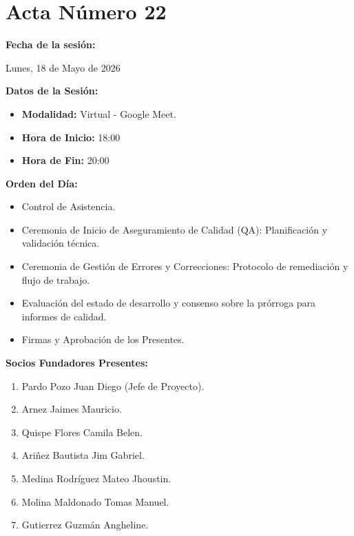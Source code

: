 \newpage
\section{Acta Número 22}
\label{sec:acta22}

\noindent \textbf{Fecha de la sesión:}\par
Lunes, 18 de Mayo de 2026

\vspace*{0.5cm}
\noindent \textbf{Datos de la Sesión:}
\vspace{-0.2cm}
\begin{itemize}[noitemsep]
    \item \textbf{Modalidad:} Virtual - Google Meet.
    \item \textbf{Hora de Inicio:} 18:00
    \item \textbf{Hora de Fin:} 20:00
\end{itemize}

\vspace*{0.5cm}
\noindent \textbf{Orden del Día:}
\vspace{-0.2cm}
\begin{itemize}[noitemsep]
    \item Control de Asistencia.
    \item Ceremonia de Inicio de Aseguramiento de Calidad (QA): Planificación y validación técnica.
    \item Ceremonia de Gestión de Errores y Correcciones: Protocolo de remediación y flujo de trabajo.
    \item Evaluación del estado de desarrollo y consenso sobre la prórroga para informes de calidad.
    \item Firmas y Aprobación de los Presentes.
\end{itemize}

\vspace*{0.5cm}
\noindent \textbf{Socios Fundadores Presentes:}
\vspace{-0.2cm}
\begin{enumerate}[noitemsep]
    \item Pardo Pozo Juan Diego (Jefe de Proyecto).
    \item Arnez Jaimes Mauricio.
    \item Quispe Flores Camila Belen.
    \item Ariñez Bautista Jim Gabriel.
    \item Medina Rodríguez Mateo Jhoustin.
    \item Molina Maldonado Tomas Manuel.
    \item Gutierrez Guzmán Angheline.
\end{enumerate}

